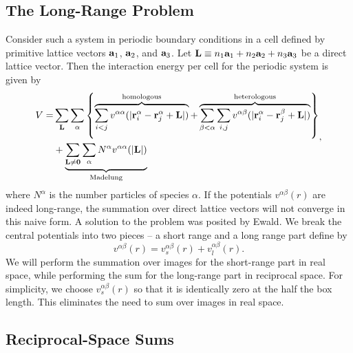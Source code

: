 \subsection{The Long-Range Problem}
Consider such a system in periodic boundary conditions in a cell
defined by primitive lattice vectors $\mathbf{a}_1$, $\mathbf{a}_2$, and $\mathbf{a}_3$.
Let $\mathbf{L} \equiv n_1 \mathbf{a}_1 + n_2 \mathbf{a}_2 + n_3\mathbf{a}_3$ be a direct lattice
vector.  Then the interaction energy per cell for the periodic system
is given by
\begin{equation}
\begin{split}
V = & \sum_{\mathbf{L}} \sum_\alpha \left\{ 
\overbrace{\sum_{i<j} v^{\alpha\alpha}(|\mathbf{r}^\alpha_i - \mathbf{r}^\alpha_j + \mathbf{L}|)}^{\text{homologous}} +
\overbrace{\sum_{\beta<\alpha} 
\sum_{i,j} v^{\alpha \beta}(|\mathbf{r}^{\alpha}_i - \mathbf{r}^{\beta}_j+\mathbf{L}|)}^{\text{heterologous}}
\right\}  \\
& + \underbrace{\sum_{\mathbf{L} \neq \mathbf{0}} \sum_\alpha N^\alpha v^{\alpha \alpha} (|\mathbf{L}|)}_\text{Madelung}
\end{split}
\label{eq:direct},
\end{equation}
where $N^\alpha$ is the number particles of species $\alpha$.
If the potentials $v^{\alpha\beta}(r)$ are indeed long-range, the
summation over direct lattice vectors will not converge in this naive
form.  A solution to the problem was posited by Ewald.  We break the
central potentials into two pieces -- a short range and a long range
part define by
\begin{equation}
v^{\alpha \beta}(r) = v_s^{\alpha\beta}(r) + v_l^{\alpha \beta}(r).
\end{equation}
We will perform the summation over images for the short-range part in
real space, while performing the sum for the long-range part in
reciprocal space.  For simplicity, we choose $v^{\alpha \beta}_s(r)$
so that it is identically zero at the half the box length.  This
eliminates the need to sum over images in real space.


\subsection{Reciprocal-Space Sums}
